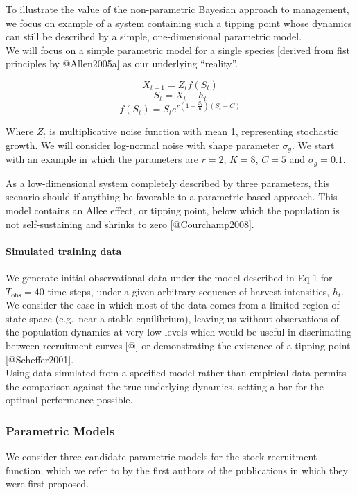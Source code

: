 \documentclass[author-year, review]{elsarticle} %
\begin{document}
To illustrate the value of the non-parametric Bayesian approach to
management, we focus on example of a system containing such a tipping
point whose dynamics can still be described by a simple, one-dimensional
parametric model.\\We will focus on a simple parametric model for a
single species {[}derived from fist principles by @Allen2005a{]} as our
underlying ``reality''.

\[X_{t+1} = Z_t f(S_t)  \] \[S_t = X_t - h_t \]
\[f(S_t) = S_t e^{r \left(1 - \frac{S_t}{K}\right)\left(S_t - C\right)} \]

Where $Z_t$ is multiplicative noise function with mean 1, representing
stochastic growth. We will consider log-normal noise with shape
parameter $\sigma_g$. We start with an example in which the parameters
are $r =2$, $K=8$, $C=5$ and $\sigma_g = 0.1$.

As a low-dimensional system completely described by three parameters,
this scenario should if anything be favorable to a parametric-based
approach. This model contains an Allee effect, or tipping point, below
which the population is not self-sustaining and shrinks to zero
{[}@Courchamp2008{]}.

\paragraph{Simulated training data}

We generate initial observational data under the model described in Eq 1
for $T_{\textrm{obs}}=40$ time steps, under a given arbitrary sequence
of harvest intensities, $h_t$. We consider the case in which most of the
data comes from a limited region of state space (e.g.~near a stable
equilibrium), leaving us without observations of the population dynamics
at very low levels which would be useful in discrimating between
recruitment curves {[}@{]} or demonstrating the existence of a tipping
point {[}@Scheffer2001{]}.\\Using data simulated from a specified model
rather than empirical data permits the comparison against the true
underlying dynamics, setting a bar for the optimal performance possible.

\subsubsection{Parametric Models}

We consider three candidate parametric models for the stock-recruitment
function, which we refer to by the first authors of the publications in
which they were first proposed.
\end{document}
